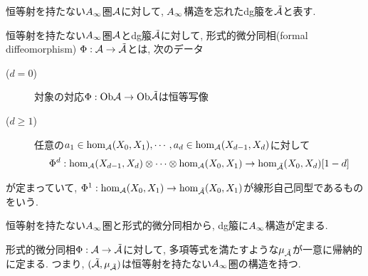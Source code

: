 \documentclass[uplatex, a4paper, 14Q, dvipdfmx]{jsarticle}
\begin{document}

\begin{notation}
  恒等射を持たない$A_{\infty}$圏$\mathcal{A}$に対して, $A_{\infty}$構造を忘れたdg箙を$\tilde{\mathcal{A}}$と表す. 
\end{notation}

\begin{definition}[形式的微分同相] \label{def_formal_diffeomorphism}
  恒等射を持たない$A_{\infty}$圏$\mathcal{A}$とdg箙$\tilde{\mathcal{A}}$に対して, 形式的微分同相(formal diffeomorphism) $\Phi : \mathcal{A} \to \tilde{\mathcal{A}}$とは, 次のデータ 
  \begin{description}
    \item[($d=0$)] 対象の対応$\Phi : \mathrm{Ob}\mathcal{A} \to \mathrm{Ob}\tilde{\mathcal{A}}$は恒等写像
    \item[($d \geq 1$)] 任意の$a_1 \in \hom_{\mathcal{A}}(X_0,X_1), \cdots, a_d \in \hom_{\mathcal{A}}(X_{d-1},X_d)$に対して
    \begin{align*}
      \Phi^d : \hom_{\mathcal{A}}(X_{d-1},X_d) \otimes \cdots \otimes \hom_{\mathcal{A}}(X_0,X_1) \to \hom_{\tilde{\mathcal{A}}}(X_0,X_d)[1-d]
    \end{align*}
  \end{description}
  が定まっていて, $\Phi^1 : \hom_{\mathcal{A}}(X_0,X_1) \to \hom_{\tilde{\mathcal{A}}}(X_0,X_1)$が線形自己同型であるものをいう.
\end{definition}

恒等射を持たない$A_{\infty}$圏と形式的微分同相から, dg箙に$A_{\infty}$構造が定まる. 

\begin{theorem} \label{prop_modified_Ainf_structure}
  形式的微分同相$\Phi : \mathcal{A} \to \tilde{\mathcal{A}}$に対して, 多項等式を満たすような$\mu_{\tilde{\mathcal{A}}}$が一意に帰納的に定まる.
  つまり, $(\tilde{\mathcal{A}}, \mu_{\tilde{\mathcal{A}}})$は恒等射を持たない$A_{\infty}$圏の構造を持つ.  
\end{theorem}
\end{document}
